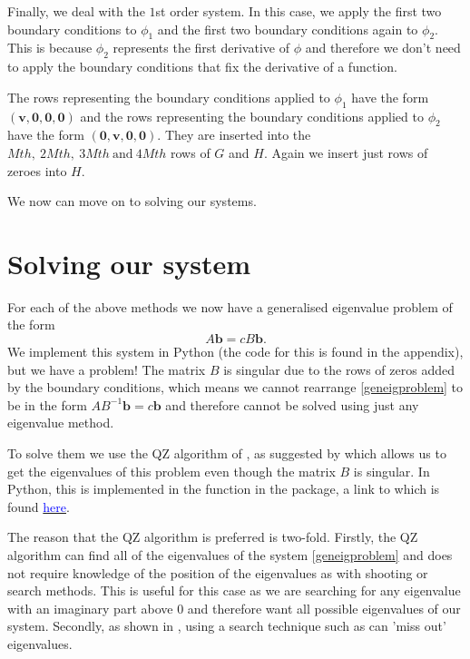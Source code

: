 Finally, we deal with the $1$st order system. In this case, we apply the first two boundary conditions to $ \phi_1 $ and the first two boundary conditions again to $ \phi_2$. This is because $ \phi_2 $ represents the first derivative of $ \phi $ and therefore we don't need to apply the boundary conditions that fix the derivative of a function. 

The rows representing the boundary conditions applied to $\phi_1$ have the form $ (\mathbf{v}, \mathbf{0}, \mathbf{0}, \mathbf{0}) $ and the rows representing the boundary conditions applied to $ \phi_2 $ have the form $ (\mathbf{0}, \mathbf{v}, \mathbf{0}, \mathbf{0}) $. They are inserted into the $Mth,\ 2Mth,\ 3Mth\ \text{and}\ 4Mth$ rows of $ G $ and $H$. Again we insert just rows of zeroes into $H$.

We now can move on to solving our systems.

\section{Solving our system} \label{section:solving}
For each of the above methods we now have a generalised eigenvalue problem of the form
\begin{equation}
    A \mathbf{b} = c B \mathbf{b}.
    \label{geneigproblem}
\end{equation}
We implement this system in Python (the code for this is found in the appendix), but we have a problem! The matrix $ B $ is singular due to the rows of zeros added by the boundary conditions, which means we cannot rearrange \eqref{geneigproblem} to be in the form $ A B^{-1} \mathbf{b} = c \mathbf{b} $ and therefore cannot be solved using just any eigenvalue method. 

To solve them we use the QZ algorithm of \cite{moler1973algorithm}, as suggested by \cite{dongarra1996chebyshev} which allows us to get the eigenvalues of this problem even though the matrix $ B $ is singular. In Python, this is implemented in the  function in the  package, a link to which is found \href{https://docs.scipy.org/doc/scipy/reference/generated/scipy.linalg.eig.html}{\textcolor{blue}{here}}. 

The reason that the QZ algorithm is preferred is two-fold. Firstly, the QZ algorithm can find all of the eigenvalues of the system \eqref{geneigproblem} and does not require knowledge of the position of the eigenvalues as with shooting or search methods. This is useful for this case as we are searching for any eigenvalue with an imaginary part above $0$ and therefore want all possible eigenvalues of our system. Secondly, as shown in \cite{dongarra1996chebyshev}, using a search technique such as \cite{orszag1971accurate} can 'miss out' eigenvalues. 

